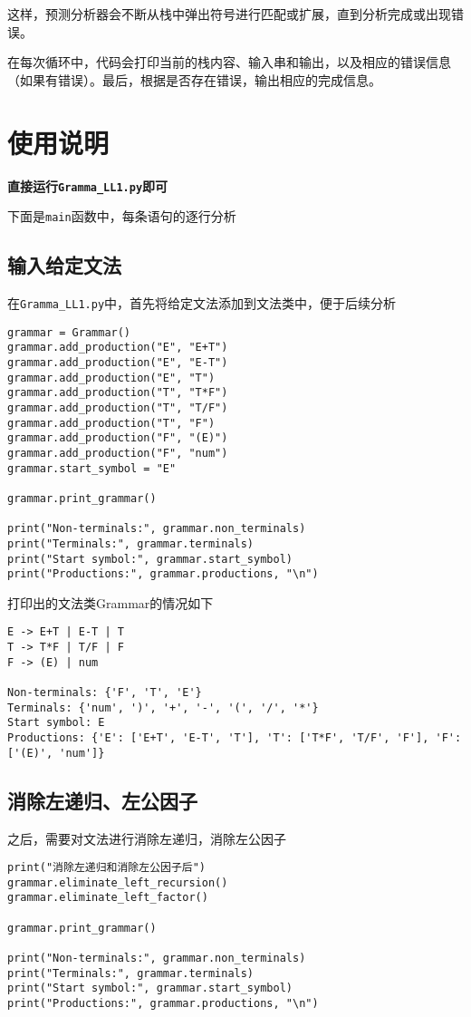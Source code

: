 \documentclass[lang=cn,11pt,a4paper]{elegantpaper}
\begin{document}
这样，预测分析器会不断从栈中弹出符号进行匹配或扩展，直到分析完成或出现错误。

在每次循环中，代码会打印当前的栈内容、输入串和输出，以及相应的错误信息（如果有错误）。最后，根据是否存在错误，输出相应的完成信息。

\section{使用说明}

\textbf{直接运行\lstinline{Gramma_LL1.py}即可}

下面是\lstinline{main}函数中，每条语句的逐行分析


\subsection{输入给定文法}
在\lstinline{Gramma_LL1.py}中，首先将给定文法添加到文法类中，便于后续分析
\begin{lstlisting}
grammar = Grammar()
grammar.add_production("E", "E+T")
grammar.add_production("E", "E-T")
grammar.add_production("E", "T")
grammar.add_production("T", "T*F")
grammar.add_production("T", "T/F")
grammar.add_production("T", "F")
grammar.add_production("F", "(E)")
grammar.add_production("F", "num")
grammar.start_symbol = "E"

grammar.print_grammar()

print("Non-terminals:", grammar.non_terminals)
print("Terminals:", grammar.terminals)
print("Start symbol:", grammar.start_symbol)
print("Productions:", grammar.productions, "\n")
\end{lstlisting}

打印出的文法类Grammar的情况如下
\begin{lstlisting}[language=text]
E -> E+T | E-T | T
T -> T*F | T/F | F
F -> (E) | num

Non-terminals: {'F', 'T', 'E'}
Terminals: {'num', ')', '+', '-', '(', '/', '*'}
Start symbol: E
Productions: {'E': ['E+T', 'E-T', 'T'], 'T': ['T*F', 'T/F', 'F'], 'F': ['(E)', 'num']} 
\end{lstlisting}

\subsection{消除左递归、左公因子}

之后，需要对文法进行消除左递归，消除左公因子
\begin{lstlisting}
print("消除左递归和消除左公因子后")
grammar.eliminate_left_recursion()
grammar.eliminate_left_factor()

grammar.print_grammar()

print("Non-terminals:", grammar.non_terminals)
print("Terminals:", grammar.terminals)
print("Start symbol:", grammar.start_symbol)
print("Productions:", grammar.productions, "\n")
\end{lstlisting}
\end{document}
